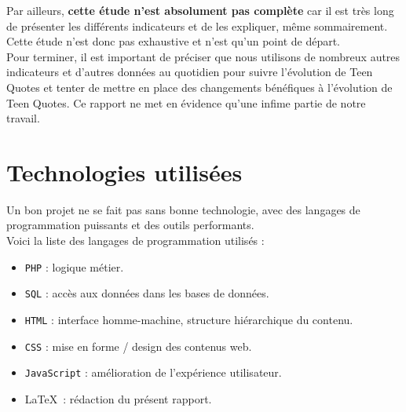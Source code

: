 \documentclass{report}
\begin{document}
	Par ailleurs, \textbf{cette étude n'est absolument pas complète} car il est très long de présenter les différents indicateurs et de les expliquer, même sommairement. Cette étude n'est donc pas exhaustive et n'est qu'un point de départ.\\

	Pour terminer, il est important de préciser que nous utilisons de nombreux autres indicateurs et d'autres données au quotidien pour suivre l'évolution de Teen Quotes et tenter de mettre en place des changements bénéfiques à l'évolution de Teen Quotes. Ce rapport ne met en évidence qu'une infime partie de notre travail.
	 
	\chapter{Technologies utilisées}
	Un bon projet ne se fait pas sans bonne technologie, avec des langages de programmation puissants et des outils performants.\\

	Voici la liste des langages de programmation utilisés :
	\vspace{10px}
	\begin{itemize}
		\item \texttt{PHP} : logique métier.
		\item \texttt{SQL} : accès aux données dans les bases de données.
		\item \texttt{HTML} : interface homme-machine, structure hiérarchique du contenu.
		\item \texttt{CSS} : mise en forme / design des contenus web.
		\item \texttt{JavaScript} : amélioration de l'expérience utilisateur.
		\item \LaTeX\ : rédaction du présent rapport.
	\end{itemize}
	\vspace{10px}
\end{document}
